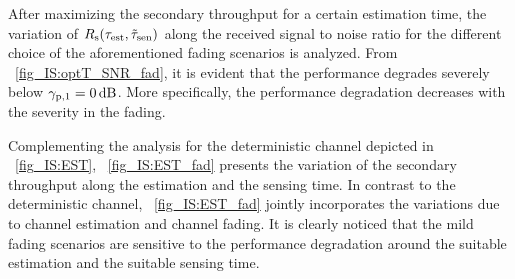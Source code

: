 {After maximizing the secondary throughput for a certain estimation time, the variation of $R_{\text{s}}(\tau_{\text{est}}, \tilde{\tau}_{\text{sen}})$ along the received signal to noise ratio for the different choice of the aforementioned fading scenarios is analyzed. From \figurename~\ref{fig_IS:optT_SNR_fad}, it is evident that the performance degrades severely below ${\gamma}_{\text{p,1}} = \SI{0}{dB}$. More specifically, the performance degradation decreases with the severity in the fading. %

Complementing the analysis for the deterministic channel depicted in \figurename~\ref{fig_IS:EST}, \figurename~\ref{fig_IS:EST_fad} presents the variation of the secondary throughput along the estimation and the sensing time. In contrast to the deterministic channel, \figurename~\ref{fig_IS:EST_fad} jointly incorporates the variations due to channel estimation and channel fading. It is clearly noticed that the mild fading scenarios are sensitive to the performance degradation around the suitable estimation and the suitable sensing time.




\begin{figure}[!t]


\centering
{}
\end{figure}}

